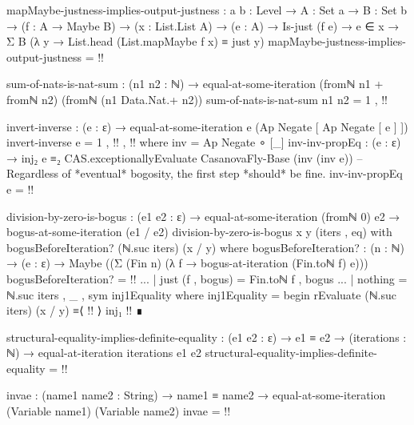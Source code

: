 \documentclass{report}
\begin{document}
\begin{code}
  mapMaybe-justness-implies-output-justness :
    {a b : Level} →
    {A : Set a} →
    {B : Set b} →
    (f : A → Maybe B) →
    (x : List.List A) →
    (e : A) →
    Is-just (f e) →
    e ∈ x →
    Σ B (λ y → List.head (List.mapMaybe f x) ≡ just y)
  mapMaybe-justness-implies-output-justness = {!!}

  sum-of-nats-is-nat-sum :
    (n1 n2 : ℕ) →
    equal-at-some-iteration (fromℕ n1 + fromℕ n2) (fromℕ (n1 Data.Nat.+ n2))
  sum-of-nats-is-nat-sum n1 n2 = 1 , {!!}

  invert-inverse : (e : ε) → equal-at-some-iteration e (Ap Negate [ Ap Negate [ e ] ])
  invert-inverse e = 1 , {!!} , {!!}
    where
    inv = Ap Negate ∘ [_]
    inv-inv-propEq :
      (e : ε) →
      inj₂ e ≡₂ CAS.exceptionallyEvaluate CasanovaFly-Base (inv (inv e))
    -- Regardless of *eventual* bogosity, the first step *should* be fine.
    inv-inv-propEq e = {!!}

  division-by-zero-is-bogus :
    (e1 e2 : ε) →
    equal-at-some-iteration (fromℕ 0) e2 →
    bogus-at-some-iteration (e1 / e2)
  division-by-zero-is-bogus x y (iters , eq) with bogusBeforeIteration? (ℕ.suc iters) (x / y)
    where
    bogusBeforeIteration? :
      (n : ℕ) →
      (e : ε) →
      Maybe ((Σ (Fin n) (λ f → bogus-at-iteration (Fin.toℕ f) e)))
    bogusBeforeIteration? = {!!}
  ... | just (f , bogus) = Fin.toℕ f , bogus
  ... | nothing = ℕ.suc iters , _ , sym inj1Equality
    where
    inj1Equality = begin
      rEvaluate (ℕ.suc iters) (x / y)
        ≡⟨ {!!} ⟩
      inj₁ {!!} ∎

  structural-equality-implies-definite-equality :
    (e1 e2 : ε) →
    e1 ≡ e2 →
    (iterations : ℕ) →
    equal-at-iteration iterations e1 e2
  structural-equality-implies-definite-equality = {!!}

  invae : (name1 name2 : String) →
          name1 ≡ name2 →
          equal-at-some-iteration (Variable name1) (Variable name2)
  invae = {!!}
\end{code}
\end{document}
